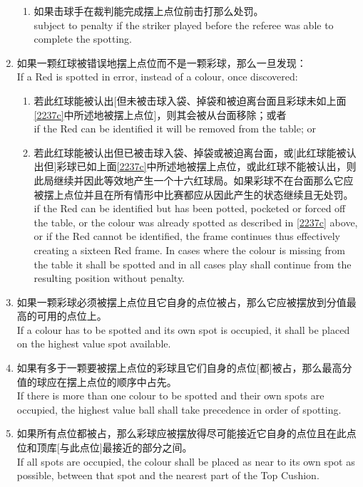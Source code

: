 \begin{enumerate}[label=(\alph*)]
\begin{enumerate}[label=(\roman*)]
        \item 如果击球手在裁判能完成摆上点位前击打那么处罚。\\
        subject to penalty if the striker played before the referee was able to complete the spotting.
    \end{enumerate}
    \item 如果一颗红球被错误地摆上点位而不是一颗彩球，那么一旦发现：\\
    If a Red is spotted in error, instead of a colour, once discovered:
    \begin{enumerate}[label=(\roman*)]
        \item 若此红球能被认出[但未被击球入袋、掉袋和被迫离台面且彩球未如上面\ref{2237c}中所述地被摆上点位]，则其会被从台面移除；或者\\
        if the Red can be identified it will be removed from the table; or
        \item 若此红球能被认出但已被击球入袋、掉袋或被迫离台面，或[此红球能被认出但]彩球已如上面\ref{2237c}中所述地被摆上点位，或此红球不能被认出，则此局继续并因此等效地产生一个十六红球局。如果彩球不在台面那么它应被摆上点位并且在所有情形中比赛都应从因此产生的状态继续且无处罚。\\
        if the Red can be identified but has been potted, pocketed or forced off the table, or the colour was already spotted as described in \ref{2237c} above, or if the Red cannot be identified, the frame continues thus effectively creating a sixteen Red frame. In cases where the colour is missing from the table it shall be spotted and in all cases play shall continue from the resulting position without penalty.
    \end{enumerate}
    \item 如果一颗彩球必须被摆上点位且它自身的点位被占，那么它应被摆放到分值最高的可用的点位上。\\
    If a colour has to be spotted and its own spot is occupied, it shall be placed on the highest value spot available.
    \item 如果有多于一颗要被摆上点位的彩球且它们自身的点位[都]被占，那么最高分值的球应在摆上点位的顺序中占先。\\
    If there is more than one colour to be spotted and their own spots are occupied, the highest value ball shall take precedence in order of spotting.
    \item 如果所有点位都被占，那么彩球应被摆放得尽可能接近它自身的点位且在此点位和顶库[与此点位]最接近的部分之间。\\
    If all spots are occupied, the colour shall be placed as near to its own spot as possible, between that spot and the nearest part of the Top Cushion.

\end{enumerate}
